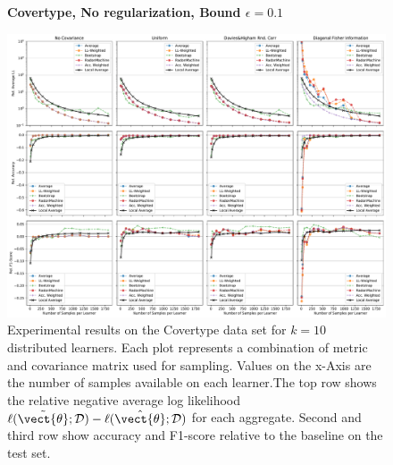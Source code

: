 \begin{landscape}
    \begin{figure}
        \centering
        \textbf{Covertype, No regularization, Bound $\epsilon=0.1$}\par\medskip
        \includegraphics[height=\dimexpr \textheight - 4\baselineskip\relax]{kapitel/figures/covertype_None_0.1_neg_relative.pdf}
        \caption[Covertype plots without regularization and $\epsilon=0.1$]{Experimental results on the Covertype data set for $k=10$ distributed learners. Each plot represents a combination of metric and covariance matrix used for sampling. Values on the x-Axis are the number of samples available on each learner.The top row shows the relative negative average log likelihood $\ell(\tilde{\vect{\theta}}; \mathcal{D}) - \ell(\hat{\vect{\theta}}; \mathcal{D})$ for each aggregate. Second and third row show accuracy and F1-score relative to the baseline on the test set.}
        \label{fig:analysis7}
    \end{figure}
    \end{landscape}
